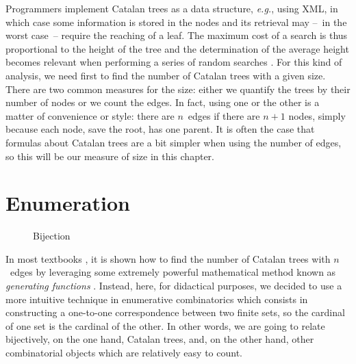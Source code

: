 Programmers implement Catalan trees as a data structure, \emph{e.g.},
using \textsf{XML}, in which case some information is stored in the
nodes and its retrieval may --~in the worst case~-- require the
reaching of a leaf. The maximum cost of a search is thus proportional
to the height of the tree and the determination of the average height
becomes relevant when performing a series of random searches
\citep{VitterFlajolet_1990}. For this kind of analysis, we need first
to find the number of Catalan trees with a given size. There are two
common measures for the size: either we quantify the trees by their
number of nodes or we count the edges. In fact, using one or the other
is a matter of convenience or style: there are \(n\)~edges if there
are \(n+1\) nodes, simply because each node, save the root, has one
parent. It is often the case that formulas about Catalan trees are a
bit simpler when using the number of edges, so this will be our
measure of size in this chapter.

\section{Enumeration}
\label{sec:Catalan_enumeration}

%
\begin{wrapfigure}[10]{r}[0pt]{0pt}
\hspace*{0pt} %
\centering
{}
\quad
{}
\caption{Bijection}
\label{fig:bijection}
\end{wrapfigure}
In most textbooks \cite[\S~5.1 \&~5.2]{SedgewickFlajolet_1996}, it is
shown how to find the number of Catalan trees with \(n\)~edges by
leveraging some extremely powerful mathematical method known as
\emph{generating functions} \cite[chap.~7]{GrahamKnuthPatashnik_1994}. Instead, here,
for didactical purposes, we decided to use a more intuitive technique
in enumerative combinatorics which
consists in constructing a one\hyp{}to\hyp{}one correspondence between
two finite sets, so the cardinal of one set is the cardinal of the
other. In other words, we are going to relate bijectively, on the one
hand, Catalan trees, and, on the other hand, other combinatorial
objects which are relatively easy to count.


